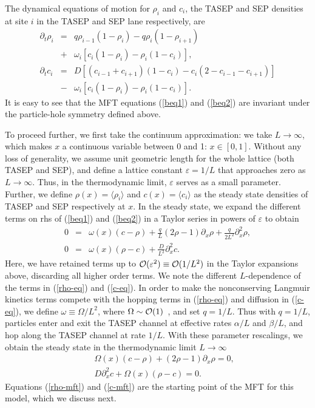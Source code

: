 \documentclass[aps,pre,twocolumn,superscriptaddress,amsmath,amssymb,longbibliography,floatfix,nofootinbib]{revtex4}
\begin{document}
The dynamical equations of motion for $\rho_i$ and $c_i$, the TASEP and SEP densities at site $i$ in the TASEP and SEP lane respectively, are
\begin{eqnarray}
 \partial_t \rho_i &=& {q}\rho_{i-1}(1-\rho_i) - {q} \rho_i (1-\rho_{i+1}) \nonumber \\&+& \omega_i [ c_i(1-\rho_i)-\rho_i (1-c_i)],\label{beq1}\\
 \partial_t c_i&=& D[(c_{i-1}+c_{i+1})(1-c_i) - c_i(2-c_{i-1}-c_{i+1})] \nonumber \\&-& \omega_i [ c_i(1-\rho_i)-\rho_i (1-c_i)]. \label{beq2}
 \end{eqnarray}
It is easy to see that the MFT equations (\ref{beq1}) and (\ref{beq2}) are invariant under the particle-hole symmetry defined above. 
 
To proceed further, we first take the continuum approximation: we take $L\rightarrow \infty$, which makes $x$ a continuous variable between 0 and 1: $x\in [0,1]$. Without any loss of generality, we assume unit geometric length for the whole lattice (both TASEP and SEP), and define a lattice constant $\varepsilon = 1/L$ that approaches zero as $L\rightarrow \infty$. Thus, in the thermodynamic limit, $\varepsilon$ serves as a small parameter.  Further, we define $\rho(x)=\langle \rho_i\rangle$ and $c(x)=\langle c_i\rangle$ as the steady state densities of TASEP and SEP respectively at $x$. In the steady state, we expand the different terms on rhs of (\ref{beq1}) and (\ref{beq2}) in a Taylor series in powers of $\varepsilon$ to obtain
 \begin{eqnarray}
  0&=& \omega (x)(c-\rho)+ \frac{{q}}{L}(2\rho-1)\partial_x\rho + \frac{{q}}{2L^2}\partial_x^2 \rho,\label{rho-eq}\\
  0&=& \omega (x) (\rho-c)+ \frac{D}{L^2}\partial_x^2 c.\label{c-eq}
 \end{eqnarray}
Here, we have retained terms up to ${\cal O}(\varepsilon^2)\equiv {\cal O}(1/L^2)$ in the Taylor expansions above, discarding all higher order terms. We note the different $L$-dependence of the terms in (\ref{rho-eq}) and (\ref{c-eq}). {In order to make the nonconserving Langmuir kinetics terms compete with the hopping terms in (\ref{rho-eq}) and diffusion in (\ref{c-eq}), we define $\omega\equiv \Omega/L^2$, where $\Omega\sim {\cal O}(1)$~\cite{frey-lktasep}, and set $q=1/L$. Thus with $q=1/L$, particles enter and exit the TASEP channel at effective rates $\alpha/L$ and $\beta/L$, and hop along the TASEP channel at rate $1/L$.} With these parameter rescalings, we obtain the steady state in the thermodynamic limit $L\rightarrow\infty$
\begin{eqnarray}
 &&\Omega (x)(c-\rho)+(2\rho-1)\partial_x\rho =0,\label{rho-mft}\\
 && D\partial_x^2 c + \Omega (x) (\rho-c)=0. \label{c-mft}
\end{eqnarray}
Equations (\ref{rho-mft}) and (\ref{c-mft}) are the starting point of the MFT for this model, which we discuss next.
 
\end{document}
